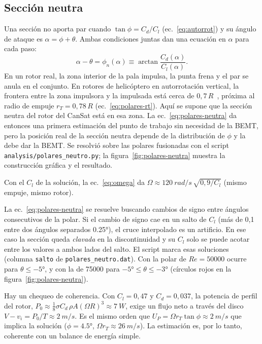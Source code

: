 \subsection{Sección neutra}
Una sección no aporta par cuando $\tan\phi=C_d/C_l$ (ec.~\ref{eq:autorrot}) y su ángulo
de ataque es $\alpha=\phi+\theta$. Ambas condiciones juntas dan una ecuación en $\alpha$
para cada paso:
\begin{equation}
  \alpha-\theta=\phi_n(\alpha)\equiv\arctan\frac{C_d(\alpha)}{C_l(\alpha)} .
  \label{eq:polares-neutra}
\end{equation}
En un rotor real, la zona interior de la pala impulsa, la punta frena y el par se anula en
el conjunto. En rotores de helicóptero en autorrotación vertical, la frontera entre la
zona impulsora y la impulsada está cerca de $0{,}7\,R$~\cite{leishman2006}, próxima al
radio de empuje $r_T=0{,}78\,R$ (ec.~\ref{eq:polares-rt}). Aquí se supone que la sección
neutra del rotor del CanSat está en esa zona. La ec.~\eqref{eq:polares-neutra} da
entonces una primera estimación del punto de trabajo sin necesidad de la BEMT, pero la
posición real de la sección neutra depende de la distribución de $\phi$ y la debe dar la
BEMT. Se resolvió
sobre las polares fusionadas con el script \texttt{analysis/polares\_neutro.py}; la
figura~\ref{fig:polares-neutra} muestra la construcción gráfica y el resultado.

Con el $C_l$ de la solución, la ec.~\eqref{eq:omega} da
$\Omega\approx\SI{120}{rad/s}\,\sqrt{0{,}9/C_l}$ (mismo empuje, mismo rotor).

La ec.~\eqref{eq:polares-neutra} se resuelve buscando cambios de signo entre ángulos
consecutivos de la polar. Si el cambio de signo cae en un salto de $C_l$ (más de 0,1 entre
dos ángulos separados \ang{0.25}), el cruce interpolado es un artificio. En ese caso la
sección queda \emph{clavada} en la discontinuidad y su $C_l$ solo se puede acotar entre
los valores a ambos lados del salto. El script marca esas soluciones (columna
\texttt{salto} de \texttt{polares\_neutro.dat}). Con la polar de $Re=\num{50000}$
ocurre para $\theta\le\ang{-5}$, y con la de \num{75000} para
$\ang{-5}\le\theta\le\ang{-3}$ (círculos rojos en la
figura~\ref{fig:polares-neutra}).

Hay un chequeo de coherencia. Con $C_l=0{,}47$ y $C_d=0{,}037$, la potencia de perfil del
rotor, $P_0\approx\tfrac18\sigma C_d\,\rho A(\Omega R)^3\approx\SI{7}{W}$, exige
un flujo neto a través del disco $V-v_i=P_0/T\approx\SI{2}{m/s}$. Es el mismo orden que
$U_P=\Omega r_T\tan\phi\approx\SI{2}{m/s}$ que implica la solución
($\phi=\ang{4.5}$, $\Omega r_T\approx\SI{26}{m/s}$). La estimación es, por lo tanto,
coherente con un balance de energía simple.

